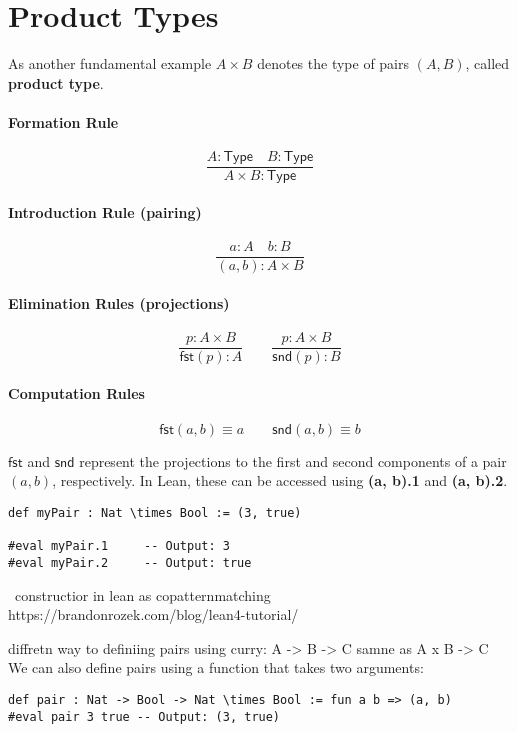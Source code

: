 \section{Product Types}

As another fundamental example $A \times B$ denotes the type of pairs $(A,B)$, called \textbf{product type}.

\paragraph{Formation Rule}
\[
  \frac{A : \mathsf{Type} \quad B : \mathsf{Type}}{A \times B : \mathsf{Type}}
\]

\paragraph{Introduction Rule (pairing)}
\[
  \frac{a : A \quad b : B}{(a, b) : A \times B}
\]

\paragraph{Elimination Rules (projections)}
\[
  \frac{p : A \times B}{\mathsf{fst}(p) : A}
  \qquad
  \frac{p : A \times B}{\mathsf{snd}(p) : B}
\]

\paragraph{Computation Rules}
\[
  \mathsf{fst}(a, b) \equiv a
  \qquad
  \mathsf{snd}(a, b) \equiv b
\]
\begin{notation}
    $\mathsf{fst}$ and $\mathsf{snd}$ represent the projections to the first and second components of a pair $(a, b)$, respectively.  
    In Lean, these can be accessed using \textbf{(a, b).1} and \textbf{(a, b).2}.
\end{notation}
\begin{example}
    
\end{example}
\begin{lstlisting}[language=Lean]
def myPair : Nat \times Bool := (3, true)

#eval myPair.1     -- Output: 3
#eval myPair.2     -- Output: true

\end{lstlisting}\
constructior in lean as copatternmatching 
https://brandonrozek.com/blog/lean4-tutorial/

diffretn way to definiing pairs using curry: A -> B -> C samne as A x B -> C
We can also define pairs using a function that takes two arguments:
\begin{lstlisting}[language=Lean]
def pair : Nat -> Bool -> Nat \times Bool := fun a b => (a, b)
#eval pair 3 true -- Output: (3, true)
\end{lstlisting}

